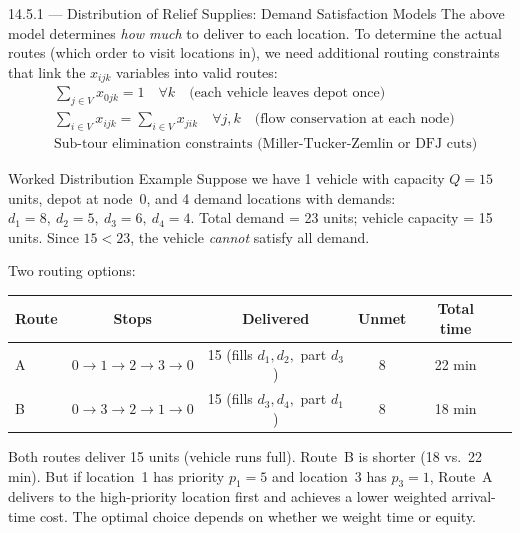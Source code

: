 \documentclass[aspectratio=169,10pt]{beamer}
\begin{document}
\begin{frame}[allowframebreaks]{14.5.1 --- Distribution of Relief Supplies: Demand Satisfaction Models}
  \medskip
  The above model determines \emph{how much} to deliver to each location.
  To determine the actual routes (which order to visit locations in),
  we need additional routing constraints that link the $x_{ijk}$
  variables into valid routes:
  \begin{align}
    & \sum_{j \in V} x_{0jk} = 1 \quad \forall k
      \quad \text{(each vehicle leaves depot once)} \\
    & \sum_{i \in V} x_{ijk} = \sum_{i \in V} x_{jik} \quad \forall j,k
      \quad \text{(flow conservation at each node)} \\
    & \text{Sub-tour elimination constraints (Miller-Tucker-Zemlin or}
      \text{ DFJ cuts)}
  \end{align}

  \framebreak

  \begin{exampleblock}{Worked Distribution Example}
    Suppose we have 1 vehicle with capacity $Q = 15$ units,
    depot at node~0, and 4 demand locations with demands:
    $d_1 = 8,\ d_2 = 5,\ d_3 = 6,\ d_4 = 4$.
    Total demand = 23 units; vehicle capacity = 15 units.
    Since $15 < 23$, the vehicle \emph{cannot} satisfy all demand.

    Two routing options:
    \begin{center}
    \begin{tabular}{lccccc}
      \toprule
      Route & Stops & Delivered & Unmet & Total time \\
      \midrule
      A & $0 \to 1 \to 2 \to 3 \to 0$ & 15 (fills $d_1,d_2,$ part $d_3$) & 8 & 22 min \\
      B & $0 \to 3 \to 2 \to 1 \to 0$ & 15 (fills $d_3,d_4,$ part $d_1$) & 8 & 18 min \\
      \bottomrule
    \end{tabular}
    \end{center}
    Both routes deliver 15 units (vehicle runs full).
    Route~B is shorter (18 vs.\ 22 min).
    But if location~1 has priority $p_1 = 5$ and location~3 has
    $p_3 = 1$, Route~A delivers to the high-priority location first
    and achieves a lower weighted arrival-time cost.
    The optimal choice depends on whether we weight time or equity.
  \end{exampleblock}
\end{frame}
\end{document}
